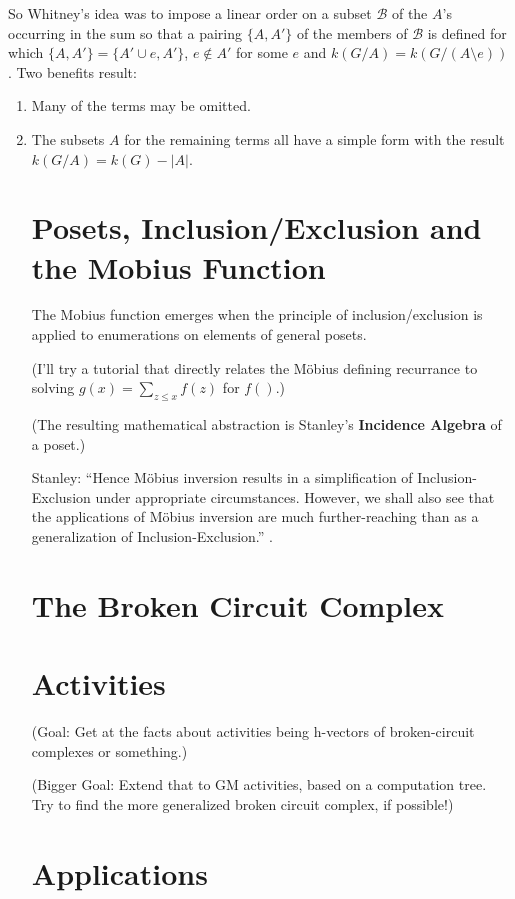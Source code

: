 \documentclass{article}
\begin{document}
So Whitney's idea was to impose a linear order on a subset $\mathcal{B}$
of the $A$'s occurring 
in the sum so that a pairing $\{A,A'\}$ of the members of $\mathcal{B}$ 
is defined for which $\{A,A'\}=\{A'\cup e, A'\}$, $e\not\in A'$ for some $e$
and $k(G/A) = k(G/(A\setminus e))$.  Two benefits result:
\begin{enumerate}
\item Many of the terms may be omitted.
\item The subsets $A$ for the remaining terms all have a simple form with the 
result $k(G/A) = k(G) - |A| $.

\section{Posets, Inclusion/Exclusion and the Mobius Function}

The Mobius function emerges when the principle of inclusion/exclusion is
applied to enumerations on elements of general posets.

(I'll try a tutorial that directly relates the M\"{o}bius defining recurrance to
solving $g(x) = \sum_{z\le x}f(z)$ for $f()$.)

(The resulting mathematical abstraction is Stanley's 
\textbf{Incidence Algebra} of a poset\cite{StanleyEC1}.)

Stanley: ``Hence M\"{o}bius inversion results in a simplification
of Inclusion-Exclusion under appropriate circumstances. However, we shall also see that
the applications of M\"{o}bius inversion are much 
further-reaching than as a generalization of
Inclusion-Exclusion.'' \cite[ch.~3]{StanleyEC1}.

\section{The Broken Circuit Complex}

\section{Activities}

(Goal: Get at the facts about activities being h-vectors of broken-circuit complexes or 
something.)

(Bigger Goal: Extend that to GM activities, based on a computation tree.  Try to find 
the more generalized broken circuit complex, if possible!)

\section{Applications}


\end{enumerate}
\end{document}
